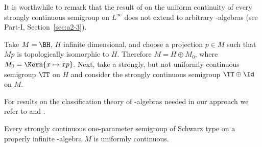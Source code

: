 It is worthwhile to remark that the result of  \textcite{lotz:1985} on the uniform continuity of every strongly continuous semigroup on $L^{\infty}$  does not extend to arbitrary \WA-algebras (see Part-I, Section~\ref{sec:a2-3}).
\begin{example}\label{ex:d2-1.1}
Take $M = \BH$, $H$ infinite dimensional, and choose a projection $p \in M$ such that $Mp$ is topologically isomorphic to $H$.
Therefore $M = H \oplus M_{0}$, where $M_{0} = \Kern{x \mapsto xp}$.
Next, take a strongly, but not uniformly continuous semigroup $\TT$ on $H$ and consider the strongly continuous semigroup $\TT \oplus \Id$ on $M$.
\end{example}
For results on the classification theory of \WA-algebras needed in our approach we refer to \textcite[2.2]{sakai:1971} and \textcite[V.1]{takesaki:1979}.
\begin{theorem}\label{thm:schwarz_uniform}
Every strongly continuous one-parameter semigroup of Schwarz type on a properly infinite \WA-algebra $M$ is uniformly continuous.
\end{theorem}
